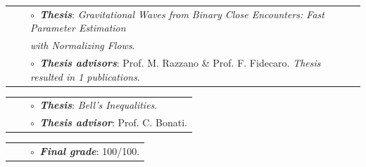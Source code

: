 \vspace{0.2cm}
\vspace{-0.1cm}
\begin{tabular}{rcl}
&\hspace{0.4cm} &$\circ\;\;${\textbf{\textit{Thesis}}}: \textit{Gravitational Waves from Binary Close Encounters: Fast Parameter Estimation} \\&\hspace{0.4cm} & 
\hspace{0.4cm}
\textit{\phantom{Thesis } with Normalizing Flows}.\\
&\hspace{0.4cm} &$\circ\;\;${\textbf{\textit{Thesis advisors}}}: Prof. M. Razzano \& Prof. F. Fidecaro. \textit{Thesis resulted in 1 publications}.\\

\end{tabular}

\vspace{0.2cm}
\vspace{-0.1cm}
\begin{tabular}{rcl}
&\hspace{0.4cm} &$\circ\;\;${\textbf{\textit{Thesis}}}: \textit{Bell's Inequalities}.\\
&\hspace{0.4cm} &$\circ\;\;${\textbf{\textit{Thesis advisor}}}:  Prof. C. Bonati.\\
\end{tabular}


\vspace{0.2cm}
\vspace{-0.1cm}
\begin{tabular}{rcl}
&\hspace{0.4cm} &$\circ\;\;${\textbf{\textit{Final grade}}}:  100/100.\\
\end{tabular}

